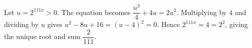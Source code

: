 Let $u=2^{111x}>0$. The equation becomes $\dfrac{u^3}{4}+4u=2u^2$. Multiplying by $4$ and dividing by $u$ gives $u^2-8u+16=(u-4)^2=0$. Hence $2^{111x}=4=2^2$, giving the unique root and sum $\boxed{\dfrac{2}{111}}$.
